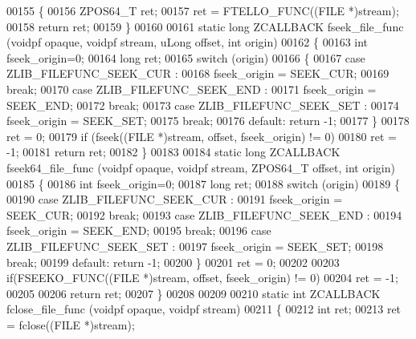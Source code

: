 \begin{DoxyCode}
00155 \{
00156     ZPOS64\_T ret;
00157     ret = FTELLO\_FUNC((FILE *)stream);
00158     \textcolor{keywordflow}{return} ret;
00159 \}
00160 
00161 \textcolor{keyword}{static} \textcolor{keywordtype}{long} ZCALLBACK fseek\_file\_func (voidpf  opaque, voidpf stream, uLong offset, \textcolor{keywordtype}{int} origin)
00162 \{
00163     \textcolor{keywordtype}{int} fseek\_origin=0;
00164     \textcolor{keywordtype}{long} ret;
00165     \textcolor{keywordflow}{switch} (origin)
00166     \{
00167     \textcolor{keywordflow}{case} ZLIB\_FILEFUNC\_SEEK\_CUR :
00168         fseek\_origin = SEEK\_CUR;
00169         \textcolor{keywordflow}{break};
00170     \textcolor{keywordflow}{case} ZLIB\_FILEFUNC\_SEEK\_END :
00171         fseek\_origin = SEEK\_END;
00172         \textcolor{keywordflow}{break};
00173     \textcolor{keywordflow}{case} ZLIB\_FILEFUNC\_SEEK\_SET :
00174         fseek\_origin = SEEK\_SET;
00175         \textcolor{keywordflow}{break};
00176     \textcolor{keywordflow}{default}: \textcolor{keywordflow}{return} -1;
00177     \}
00178     ret = 0;
00179     \textcolor{keywordflow}{if} (fseek((FILE *)stream, offset, fseek\_origin) != 0)
00180         ret = -1;
00181     \textcolor{keywordflow}{return} ret;
00182 \}
00183 
00184 \textcolor{keyword}{static} \textcolor{keywordtype}{long} ZCALLBACK fseek64\_file\_func (voidpf  opaque, voidpf stream, ZPOS64\_T offset, \textcolor{keywordtype}{int} origin)
00185 \{
00186     \textcolor{keywordtype}{int} fseek\_origin=0;
00187     \textcolor{keywordtype}{long} ret;
00188     \textcolor{keywordflow}{switch} (origin)
00189     \{
00190     \textcolor{keywordflow}{case} ZLIB\_FILEFUNC\_SEEK\_CUR :
00191         fseek\_origin = SEEK\_CUR;
00192         \textcolor{keywordflow}{break};
00193     \textcolor{keywordflow}{case} ZLIB\_FILEFUNC\_SEEK\_END :
00194         fseek\_origin = SEEK\_END;
00195         \textcolor{keywordflow}{break};
00196     \textcolor{keywordflow}{case} ZLIB\_FILEFUNC\_SEEK\_SET :
00197         fseek\_origin = SEEK\_SET;
00198         \textcolor{keywordflow}{break};
00199     \textcolor{keywordflow}{default}: \textcolor{keywordflow}{return} -1;
00200     \}
00201     ret = 0;
00202 
00203     \textcolor{keywordflow}{if}(FSEEKO\_FUNC((FILE *)stream, offset, fseek\_origin) != 0)
00204                         ret = -1;
00205 
00206     \textcolor{keywordflow}{return} ret;
00207 \}
00208 
00209 
00210 \textcolor{keyword}{static} \textcolor{keywordtype}{int} ZCALLBACK fclose\_file\_func (voidpf opaque, voidpf stream)
00211 \{
00212     \textcolor{keywordtype}{int} ret;
00213     ret = fclose((FILE *)stream);

\end{DoxyCode}
